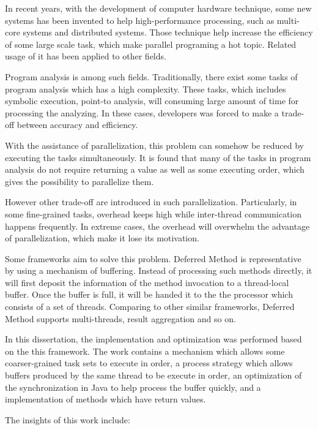 \begin{englishabstract}

In recent years, with the development of computer hardware technique, some new systems has been invented to help high-performance processing, such as multi-core systems and distributed systems. Those technique help increase the efficiency of some large scale task, which make parallel programing a hot topic. Related usage of it has been applied to other fields.

Program analysis is among such fields. Traditionally, there exist some tasks of program analysis which has a high complexity. These tasks, which includes symbolic execution, point-to analysis, will consuming large amount of time for processing the analyzing. In these cases, developers was forced to make a trade-off between accuracy and efficiency.

With the assistance of parallelization, this problem can somehow be reduced by executing the tasks simultaneously. It is found that many of the tasks in program analysis do not require returning a value as well as some executing order, which gives the possibility to parallelize them.

However other trade-off are introduced in such parallelization. Particularly, in some fine-grained tasks, overhead keeps high while inter-thread communication happens frequently. In extreme cases, the overhead will overwhelm the advantage of parallelization, which make it lose its motivation.

Some frameworks aim to solve this problem. Deferred Method is representative by using a mechanism of buffering. Instead of processing such methods directly, it will first deposit the information of the method invocation to a thread-local buffer. Once the buffer is full, it will be handed it to the the processor which consists of a set of threads. Comparing to other similar frameworks, Deferred Method supports multi-threads, result aggregation and so on.

In this dissertation, the implementation and optimization was performed based on the this framework. The work contains a mechanism which allows some coarser-grained task sets to execute in order, a process strategy which allows buffers produced by the same thread to be execute in order, an optimization of the synchronization in Java to help process the buffer quickly, and a implementation of methods which have return values.

The insights of this work include:


\end{englishabstract}
